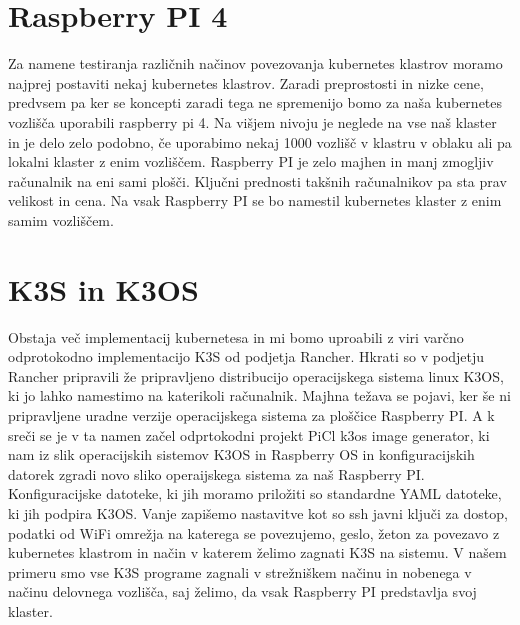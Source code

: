 \documentclass[a4paper, 12pt]{book}
\begin{document}
\section{Raspberry PI 4}
Za namene testiranja različnih načinov povezovanja kubernetes klastrov moramo najprej postaviti nekaj kubernetes klastrov.
Zaradi preprostosti in nizke cene, predvsem pa ker se koncepti zaradi tega ne spremenijo bomo za naša kubernetes vozlišča uporabili raspberry pi 4.
Na višjem nivoju je neglede na vse naš klaster in je delo zelo podobno, če uporabimo nekaj 1000 vozlišč v klastru v oblaku ali pa lokalni klaster z enim vozliščem.
Raspberry PI je zelo majhen in manj zmogljiv računalnik na eni sami plošči.
Ključni prednosti takšnih računalnikov pa sta prav velikost in cena.
Na vsak Raspberry PI se bo namestil kubernetes klaster z enim samim vozliščem.
\section{K3S in K3OS}
Obstaja več implementacij kubernetesa in mi bomo uproabili z viri varčno odprotokodno implementacijo K3S od podjetja Rancher. Hkrati so v podjetju Rancher pripravili že pripravljeno distribucijo operacijskega sistema linux K3OS, ki jo lahko namestimo na katerikoli računalnik. 
Majhna težava se pojavi, ker še ni pripravljene uradne verzije operacijskega sistema za ploščice Raspberry PI.
A k sreči se je v ta namen začel odprtokodni projekt PiCl k3os image generator, ki nam iz slik operacijskih sistemov K3OS in Raspberry OS in konfiguracijskih datorek zgradi novo sliko operaijskega sistema za naš Raspberry PI.
Konfiguracijske datoteke, ki jih moramo priložiti so standardne YAML datoteke, ki jih podpira K3OS.
Vanje zapišemo nastavitve kot so ssh javni ključi za dostop, podatki od WiFi omrežja na katerega se povezujemo, geslo, žeton za povezavo z kubernetes klastrom in način v katerem želimo zagnati K3S na sistemu.
V našem primeru smo vse K3S programe zagnali v strežniškem načinu in nobenega v načinu delovnega vozlišča, saj želimo, da vsak Raspberry PI predstavlja svoj klaster.
\end{document}
